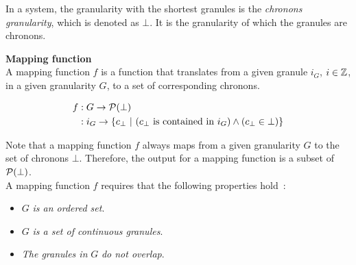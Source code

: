 

In a system, the granularity with the shortest granules is the \emph{chronons granularity}, which is denoted as $\bot$. It is the granularity of which the granules are chronons. 

\begin{svgraybox}
\begin{definition}
\label{def:mapping-function}
\textbf{Mapping function}~\cite{Lin97}\\ 
A mapping function $f$ is a function that translates from a given granule $i_G$, $i \in \mathbb{Z}$, in a given granularity $G$, to a set of corresponding chronons.\\

\vspace{-10pt}

\begin{align}
f & : G \rightarrow \mathcal{P}(\bot)\nonumber\\
  & : i_{G} \rightarrow \lbrace c_\bot\ |\ (c_\bot\text{ is contained in }i_{G}) \wedge (c_\bot \in \bot)\rbrace\nonumber
\end{align}
\end{definition}
\end{svgraybox}

Note that a mapping function $f$ always maps from a given granularity $G$ to the set of chronons $\bot$. Therefore, the output for a mapping function is a subset of $\mathcal{P}(\bot)$. \\
 A mapping function $f$ requires that the following properties hold~\cite{Lin97}:
 
 \begin{itemize}
 \item
 $G$ \emph{is an ordered set}.
 \item
 $G$ \emph{is a set of continuous granules}.
 \item
 \emph{The granules in} $G$ \emph{do not overlap}.
 \end{itemize}

